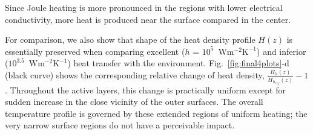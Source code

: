 \documentclass[%
9pt,
 aip,
rsi,%
 amsmath,amssymb,
preprint,%
]{revtex4-1}
\newcommand{\hcoefficient}{$\mathrm{W m^{-2} K^{-1}}$}
\begin{document}
Since Joule heating is more pronounced in the regions with lower electrical conductivity, more heat is produced near the surface compared in the center.

For comparison, we also show that shape of the heat density profile $H(z)$ is essentially preserved when comparing excellent ($h$ = $10^{5}$~\hcoefficient) and inferior ($10^{3.5}$~\hcoefficient) heat transfer with the environment.
Fig.~\ref{fig:final4plots}-d (black curve) shows the corresponding relative change of heat density, $\frac{H_{h}(z)}{H_{h_{ref}}(z)}-1$.
Throughout the active layers, this change is practically uniform except for sudden increase in the close vicinity of the outer surfaces. The overall temperature profile is governed by these extended regions of uniform heating; the very narrow surface regions do not have a perceivable impact.




\end{document}
